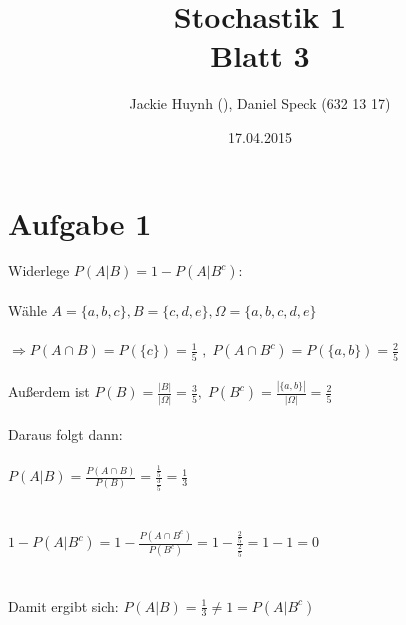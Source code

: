 \documentclass[10pt,a4paper]{article}
\title{\textbf{\huge Stochastik 1
\\\large Blatt 3}}
\author{Jackie Huynh (\qquad\qquad), Daniel Speck (632 13 17)}
\date{17.04.2015}
\begin{document}
	\maketitle


	\section*{Aufgabe 1}
	
		Widerlege $P(A|B) = 1 - P(A | B^c)$:
		\\
		\\
		Wähle
		$\displaystyle A = \{a, b, c\}, B = \{c, d, e\}, \Omega = \{a,b,c,d,e\}$
		\\
		\\
		$\displaystyle \Rightarrow P(A \cap B) = P(\{c\}) = \frac{1}{5}$
		$\displaystyle ,\; P(A \cap B^c) = P(\{a,b\}) = \frac{2}{5}$
		\\
		\\
		Außerdem ist $\displaystyle P(B) = \frac{|B|}{|\Omega|} =\frac{3}{5}, \; P(B^c) = \frac{|\{a,b\}|}{|\Omega|} = \frac{2}{5}$
		\\
		\\
		Daraus folgt dann:
		\\
		\\
		$\displaystyle P(A|B) = \frac{P(A \cap B)}{P(B)} = \frac{\frac{1}{5}}{\frac{3}{5}} = \frac{1}{3}$
		\\
		\\
		\\
		$1 - P(A|B^c) = 1 - \displaystyle\frac{P(A \cap B^c)}{P(B^c)} = 1 - \frac{\frac{2}{5}}{\frac{2}{5}} = 1 - 1 = 0$
		\\
		\\
		\\
		Damit ergibt sich: $P(A|B) = \displaystyle\frac{1}{3} \neq 1 = P(A|B^c)$
		\begin{flushright}
			\text{$\Box$}
		\end{flushright}

		
		
\end{document}

